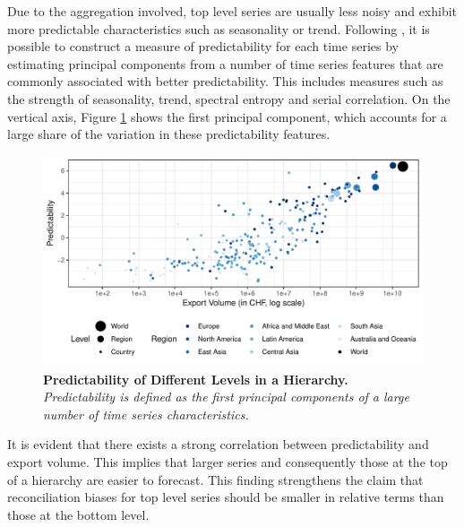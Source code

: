 \documentclass[a4paper,fleqn,11pt]{article}
\begin{document}
Due to the aggregation involved, top level series are usually less noisy and exhibit more predictable characteristics such as seasonality or trend. Following \cite{Kang2017}, it is possible to construct a measure of predictability for each time series by estimating principal components from a number of time series features that are commonly associated with better predictability. This includes measures such as the strength of seasonality, trend, spectral entropy and serial correlation.  On the vertical axis, Figure \ref{fig:feature} shows the first principal component, which accounts for a large share of the variation in these predictability features.
\begin{figure}[H]
	\includegraphics[width=\textwidth]{fig/fig_confetti}
	\caption[Predictability of Different Levels in a Hierarchy]{\textbf{Predictability of Different Levels in a Hierarchy.}\textit{ Predictability is defined as the first principal components of a large number of time series characteristics.}} \label{fig:feature}
\end{figure}
It is evident that there exists a strong correlation between predictability and export volume. This implies that larger series and consequently those at the top of a hierarchy are easier to forecast. This finding strengthens the claim that reconciliation biases for top level series should be smaller in relative terms than those at the bottom level.\\
\end{document}
